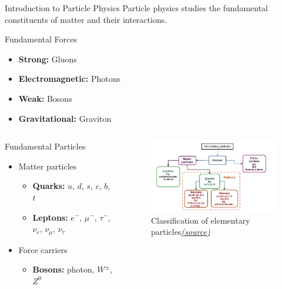 \documentclass[12pt,aspectratio169]{beamer}
\begin{document}
\begin{frame}[allowframebreaks]{Introduction to Particle Physics}
\hspace{1cm}
Particle physics studies the fundamental constituents of matter and their interactions.

\begin{block}{Fundamental Forces}
\begin{itemize}
    \item \textbf{Strong:} Gluons
    \item \textbf{Electromagnetic:} Photons
    \item \textbf{Weak:} Bosons
    \item \textbf{Gravitational:} Graviton
\end{itemize}
\end{block}
\begin{columns}
    \begin{block}{Fundamental Particles}

\begin{itemize}
    \item Matter particles
    \begin{itemize}
        \item \textbf{Quarks:} $u$, $d$, $s$, $c$, $b$, $t$
        \item \textbf{Leptons:} $e^-$, $\mu^-$, $\tau^-$, $\nu_e$, $\nu_\mu$, $\nu_\tau$
    \end{itemize}
    \item Force carriers
    \begin{itemize}
        \item \textbf{Bosons:} photon, $W^\pm$, $Z^0$
    \end{itemize}
    
\end{itemize}
\end{block}
    \begin{figure}
    \centering
    \includegraphics[width= 7cm]{particlephysics.png}
    \caption{Classification of elementary particles\href{https://medium.com/@vivekptl9/particle-physics-an-informal-introduction-d1d63f14ebc8}{\textit{(source)}}}
\end{figure}
\end{columns}

\end{frame}
\end{document}
